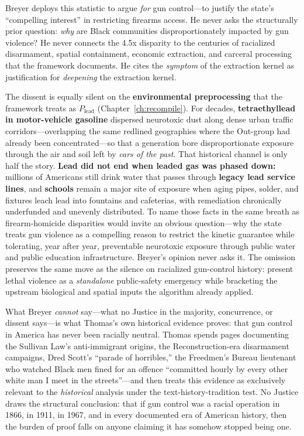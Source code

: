 Breyer deploys this statistic to argue \textit{for} gun control---to justify the state's ``compelling interest'' in restricting firearms access. He never asks the structurally prior question: \textit{why} are Black communities disproportionately impacted by gun violence? He never connects the 4.5x disparity to the centuries of racialized disarmament, spatial containment, economic extraction, and carceral processing that the framework documents. He cites the \textit{symptom} of the extraction kernel as justification for \textit{deepening} the extraction kernel.

The dissent is equally silent on the \textbf{environmental preprocessing} that the framework treats as $P_{\text{lead}}$ (Chapter~\ref{ch:recompile}). For decades, \textbf{tetraethyllead in motor-vehicle gasoline} dispersed neurotoxic dust along dense urban traffic corridors---overlapping the same redlined geographies where the Out-group had already been concentrated---so that a generation bore disproportionate exposure through the air and soil left by \textit{cars of the past}. That historical channel is only half the story. \textbf{Lead did not end when leaded gas was phased down:} millions of Americans still drink water that passes through \textbf{legacy lead service lines}, and \textbf{schools} remain a major site of exposure when aging pipes, solder, and fixtures leach lead into fountains and cafeterias, with remediation chronically underfunded and unevenly distributed. To name those facts in the same breath as firearm-homicide disparities would invite an obvious question---why the state treats gun violence as a compelling reason to restrict the kinetic guarantee while tolerating, year after year, preventable neurotoxic exposure through public water and public education infrastructure. Breyer's opinion never asks it. The omission preserves the same move as the silence on racialized gun-control history: present lethal violence as a \textit{standalone} public-safety emergency while bracketing the upstream biological and spatial inputs the algorithm already applied.

What Breyer \textit{cannot} say---what no Justice in the majority, concurrence, or dissent says---is what Thomas's own historical evidence proves: that gun control in America has never been racially neutral. Thomas spends pages documenting the Sullivan Law's anti-immigrant origins, the Reconstruction-era disarmament campaigns, Dred Scott's ``parade of horribles,'' the Freedmen's Bureau lieutenant who watched Black men fined for an offence ``committed hourly by every other white man I meet in the streets''---and then treats this evidence as exclusively relevant to the \textit{historical} analysis under the text-history-tradition test. No Justice draws the structural conclusion: that if gun control was a racial operation in 1866, in 1911, in 1967, and in every documented era of American history, then the burden of proof falls on anyone claiming it has somehow stopped being one.

